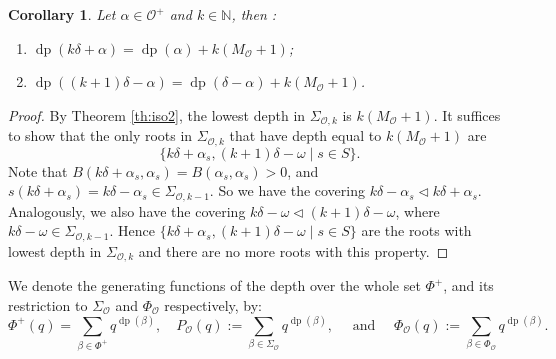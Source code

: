 \documentclass{amsart}
\newtheorem{Corollary}[Theorem]{Corollary}
\theoremstyle{definition}
\newcommand{\dep}{\operatorname{dp}}
\newcommand{\mo}{\mathcal{O}}
\begin{document}
\begin{Corollary}\label{cor:maxdep}
    Let $\alpha\in \mo^+$ and $k\in \mathbb{N}$, then :
    \begin{enumerate}
        \item $\dep(k\delta + \alpha)=\dep(\alpha)+k(M_\mo +1)$;
        \item $\dep((k+1)\delta -\alpha) = \dep(\delta-\alpha) +k(M_\mo +1)$.
    \end{enumerate}  
\end{Corollary}
\begin{proof}
    By Theorem \ref{th:iso2}, the lowest depth in $\Sigma_{\mo, k}$ is $k(M_\mo +1)$.
    It suffices to show that the only roots in $\Sigma_{\mo,k}$ that have depth equal to $k(M_\mo +1)$ are $$\{k\delta + \alpha_s, (k+1)\delta - \omega \mid s\in S\}.$$ 
    Note that $B(k\delta+\alpha_s, \alpha_s)=B(\alpha_s,\alpha_s)>0$, and $s(k\delta+\alpha_s)=k\delta-\alpha_s\in \Sigma_{\mo, k-1}$. So we have the covering $k\delta-\alpha_s\lhd k\delta+\alpha_s$. Analogously, we also have the covering $k\delta-\omega \lhd (k+1)\delta -\omega$, where $k\delta-\omega\in \Sigma_{\mo,k-1}$. Hence $\{k\delta + \alpha_s, (k+1)\delta - \omega \mid s\in S\}$ are the roots with lowest depth in $\Sigma_{\mo,k}$ and there are no more roots with this property.
\end{proof}

We denote the generating functions of the depth over the whole set $\Phi^+$, and its restriction to $\Sigma_\mo$ and $\Phi_\mo$ respectively, by: 
\begin{equation}\label{def:depth-polys}
\Phi^+(q)=\sum_{\beta\in \Phi^+} q^{\dep(\beta)}, \quad  P_{\mo}(q):=\sum_{\beta\in \Sigma_\mo} q^{\dep(\beta)},\quad \mbox{ and }\quad \Phi_{\mo}(q):=\sum_{\beta\in \Phi_{\mo}} q^{\dep(\beta)}.
\end{equation} 
\end{document}
